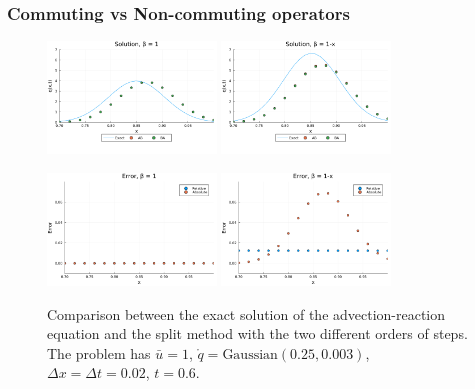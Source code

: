 \documentclass{beamer}
\renewcommand{\d}{\Delta}
\begin{document}
\begin{frame}
	\frametitle{Commuting vs Non-commuting operators}
	\begin{figure}[!ht]
		\centering
		\includegraphics[width=0.4\textwidth]{Commute.png}%
		\label{fig:commute}
		\includegraphics[width=0.4\textwidth]{NoCommute.png}%
		\label{fig:nocommute}

		\includegraphics[width=0.4\textwidth]{CommuteErr.png}%
		\label{fig:commuteErr}
		\includegraphics[width=0.4\textwidth]{NoCommuteErr.png}%
		\label{fig:nocommuteErr}
		\caption{Comparison between the exact solution of the advection-reaction equation and the split method with the two different orders of steps. The problem has $\bar{u}=1$, $\mathring{q}=\text{Gaussian}(0.25,0.003)$, $\d x = \d t = 0.02$, $t=0.6$.}
		\label{fi:AB}
	\end{figure}

\end{frame}
\end{document}
